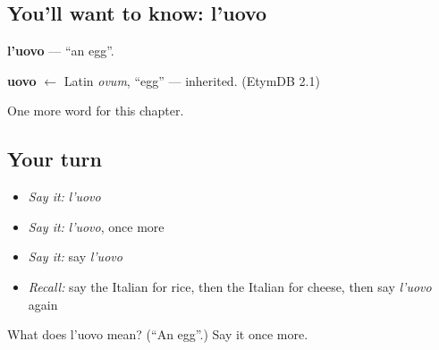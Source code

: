 \subsection*{You'll want to know: l'uovo}
\textbf{l'uovo} — \textquotedblleft{}an egg\textquotedblright{}.

\begin{cousinweb}
\textbf{uovo} $\leftarrow$ Latin \emph{ovum}, \textquotedblleft{}egg\textquotedblright{} — inherited. (EtymDB 2.1)
\end{cousinweb}

\begin{grammarlens}[title={What you've built}]
One more word for this chapter.
\end{grammarlens}

\subsection*{Your turn}
\begin{itemize}
\raggedright
  \item \emph{Say it:} \emph{l'uovo}
  \item \emph{Say it:} \emph{l'uovo}, once more
  \item \emph{Say it:} say \emph{l'uovo}
  \item \emph{Recall:} say the Italian for rice, then the Italian for cheese, then say \emph{l'uovo} again
\end{itemize}

\begin{tcolorbox}[breakable,colback=teal!4,colframe=teal!35!black,title={Before you move on}]
What does l'uovo mean? (\textquotedblleft{}An egg\textquotedblright{}.) Say it once more.
\end{tcolorbox}
